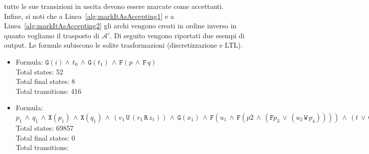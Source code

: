 \documentclass{article}
\begin{document}
    tutte le sue transizioni in uscita devono essere marcate come accettanti.
    \vspace{0.15cm}\\
    Infine, si noti che a Linea~\ref{alg:markItAsAccepting1} e a Linea~\ref{alg:markItAsAccepting2} gli archi vengono creati in ordine inverso in quanto vogliamo il trasposto di $\mathcal{A'}$.
    \newpage
    Di seguito vengono riportati due esempi di output.
    Le formule subiscono le solite trasformazioni (discretizzazione e LTL).
    \begin{itemize}
        \item Formula: $\texttt{G}(i) \land\, t_0 \,\land\, \texttt{G}(t_1)\, \land\, \texttt{F}(p \,\land\, \texttt{F}\,q)$\\
        Total states: 52\\
        Total final states: 8\\
        Total transitions: 416
        \item Formula: $p_1 \,\land\, q_1 \,\land\, \texttt{X}(p_1) \,\land\, \texttt{X}(q_1) \,\land\, (v_1\, \texttt{U}\, (r_1\, \texttt{R}\, z_1)) \,\land\, \texttt{G}(x_1) \,\land\, \texttt{F}(u_1 \,\land\, \texttt{F}(p2 \,\land\, (\texttt{F} p_3\,\lor\,(u_2\,\texttt{W}\, p_4)))) \,\land\, (t\, \lor\, \texttt{G}(\texttt{X}(w)))$\\
        Total states: 69857\\
        Total final states: 0\\
        Total transitions: \color{red}{141222368}\\
    \end{itemize}
\end{document}
